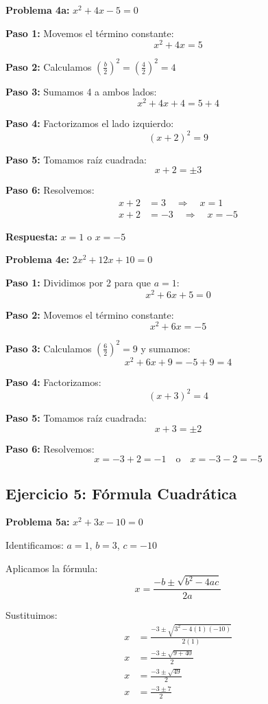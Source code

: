 \textbf{Problema 4a:} $x^2 + 4x - 5 = 0$

\textbf{Paso 1:} Movemos el término constante:
$$x^2 + 4x = 5$$

\textbf{Paso 2:} Calculamos $\left(\frac{b}{2}\right)^2 = \left(\frac{4}{2}\right)^2 = 4$

\textbf{Paso 3:} Sumamos 4 a ambos lados:
$$x^2 + 4x + 4 = 5 + 4$$

\textbf{Paso 4:} Factorizamos el lado izquierdo:
$$(x + 2)^2 = 9$$

\textbf{Paso 5:} Tomamos raíz cuadrada:
$$x + 2 = \pm 3$$

\textbf{Paso 6:} Resolvemos:
\begin{align}
x + 2 &= 3 \quad \Rightarrow \quad x = 1\\
x + 2 &= -3 \quad \Rightarrow \quad x = -5
\end{align}

\textbf{Respuesta:} $x = 1$ o $x = -5$

\textbf{Problema 4e:} $2x^2 + 12x + 10 = 0$

\textbf{Paso 1:} Dividimos por 2 para que $a = 1$:
$$x^2 + 6x + 5 = 0$$

\textbf{Paso 2:} Movemos el término constante:
$$x^2 + 6x = -5$$

\textbf{Paso 3:} Calculamos $\left(\frac{6}{2}\right)^2 = 9$ y sumamos:
$$x^2 + 6x + 9 = -5 + 9 = 4$$

\textbf{Paso 4:} Factorizamos:
$$(x + 3)^2 = 4$$

\textbf{Paso 5:} Tomamos raíz cuadrada:
$$x + 3 = \pm 2$$

\textbf{Paso 6:} Resolvemos:
$$x = -3 + 2 = -1 \quad \text{o} \quad x = -3 - 2 = -5$$


\subsection*{Ejercicio 5: Fórmula Cuadrática}

\textbf{Problema 5a:} $x^2 + 3x - 10 = 0$

Identificamos: $a = 1$, $b = 3$, $c = -10$

Aplicamos la fórmula:
$$x = \frac{-b \pm \sqrt{b^2 - 4ac}}{2a}$$

Sustituimos:
\begin{align}
x &= \frac{-3 \pm \sqrt{3^2 - 4(1)(-10)}}{2(1)}\\
x &= \frac{-3 \pm \sqrt{9 + 40}}{2}\\
x &= \frac{-3 \pm \sqrt{49}}{2}\\
x &= \frac{-3 \pm 7}{2}
\end{align}

